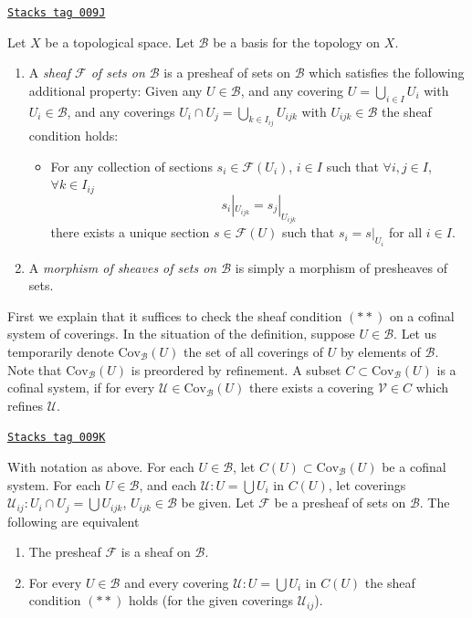 \begin{definition}
\label{sheaves-definition-sheaf-basis}
\href{https://stacks.math.columbia.edu/tag/009J}{\texttt{Stacks tag 009J}}

Let $X$ be a topological space. Let $\mathcal{B}$ be a
basis for the topology on $X$.
\begin{enumerate}
\item A {\it sheaf $\mathcal{F}$ of sets on $\mathcal{B}$} is a presheaf
of sets on $\mathcal{B}$ which satisfies the following additional
property: Given any $U \in \mathcal{B}$, and any covering
$U = \bigcup_{i \in I} U_i$ with $U_i \in \mathcal{B}$, and
any coverings $U_i \cap U_j = \bigcup_{k \in I_{ij}} U_{ijk}$ with
$U_{ijk} \in \mathcal{B}$ the sheaf condition holds:
\begin{itemize}
\item[(**)] For any collection
of sections $s_i \in \mathcal{F}(U_i)$, $i \in I$ such that
$\forall i, j\in I$, $\forall k\in I_{ij}$
$$
s_i|_{U_{ijk}} = s_j|_{U_{ijk}}
$$
there exists a unique section $s \in \mathcal{F}(U)$ such that
$s_i = s|_{U_i}$ for all $i \in I$.
\end{itemize}
\item A {\it morphism of sheaves of sets on $\mathcal{B}$} is simply a
morphism of presheaves of sets.
\end{enumerate}
\end{definition}

First we explain that it suffices to
check the sheaf condition $(**)$
on a cofinal system of coverings.
In the situation of the definition, suppose
$U \in \mathcal{B}$. Let us temporarily denote
$\text{Cov}_\mathcal{B}(U)$ the set of all coverings
of $U$ by elements of $\mathcal{B}$.
Note that $\text{Cov}_\mathcal{B}(U)$ is preordered by refinement.
A subset $C \subset \text{Cov}_\mathcal{B}(U)$ is a
cofinal system, if for every $\mathcal{U} \in \text{Cov}_\mathcal{B}(U)$
there exists a covering $\mathcal{V} \in C$ which refines $\mathcal{U}$.

\begin{lemma}
\label{sheaves-lemma-cofinal-systems-coverings}
\href{https://stacks.math.columbia.edu/tag/009K}{\texttt{Stacks tag 009K}}

With notation as above.
For each $U \in \mathcal{B}$, let $C(U) \subset \text{Cov}_\mathcal{B}(U)$
be a cofinal system. For each $U \in \mathcal{B}$, and each
$\mathcal{U} : U = \bigcup U_i$ in $C(U)$, let coverings
$\mathcal{U}_{ij} : U_i \cap U_j = \bigcup U_{ijk}$,
$U_{ijk} \in \mathcal{B}$ be given.
Let $\mathcal{F}$ be a presheaf of sets on $\mathcal{B}$.
The following are equivalent
\begin{enumerate}
\item The presheaf $\mathcal{F}$ is a sheaf on $\mathcal{B}$.
\item For every $U \in \mathcal{B}$ and every covering
$\mathcal{U} : U = \bigcup U_i$ in $C(U)$ the sheaf condition
$(**)$ holds (for the given coverings $\mathcal{U}_{ij}$).
\end{enumerate}
\end{lemma}

